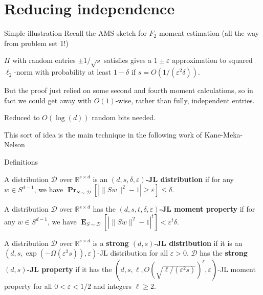 \documentclass[10pt]{beamer}
\newcommand{\R}{\mathbb{R}}
\renewcommand{\P}{\operatorname*{\mathbf{Pr}}}
\newcommand{\E}{\operatorname*{\mathbf{E}}}
\renewcommand{\l}{\left}
\renewcommand{\r}{\right}
\newcommand{\eps}{\varepsilon}
\begin{document}


\section{Reducing independence \cite{kane2011almost}}
\label{sec:}

\begin{frame}
  \sectionpage
\end{frame}

\begin{frame}{Simple illustration}
  Recall the AMS sketch for $F_2$ moment estimation (all the way from
  problem set 1!)

  \begin{theorem}
    $\Pi$ with random entries $\pm 1/\sqrt{s}$ satisfies gives a $1\pm
    \eps$ approximation to squared $\ell_2$-norm with probability at
    least $1 - \delta$ if $s = O(1/(\eps^2 \delta))$.
  \end{theorem}

  \pause\bigskip\bigskip
  But the proof just relied on some second and fourth moment
  calculations, so in fact we could get away with $O(1)$-wise, rather
  than fully, independent entries.

  \bigskip
  Reduced to $O(\log(d))$ random bits needed.

  \pause\bigskip\bigskip
  This sort of idea is the main technique in the following work of
  Kane-Meka-Nelson \cite{kane2011almost}
\end{frame}

\begin{frame}{Definitions}

  \begin{definition}
    A distribution $\mathcal{D}$ over $\R^{s\times d}$ is an
    \textbf{$(d,s,\delta,\eps)$-JL distribution} if for any $w\in
    S^{d-1}$, we have
    $\P_{S\sim\mathcal{D}}\l[|\|Sw\|^2-1|\geq\eps\r]\leq\delta$.
  \end{definition}

  \pause\bigskip

  \begin{definition}
    A distribution $\mathcal{D}$ over $\R^{s\times d}$ has the
    \textbf{$(d,s,t,\delta,\eps)$-JL moment property} if for any $w\in
    S^{d-1}$, we have
    $\E_{S\sim\mathcal{D}}\l[|\|Sw\|^2-1|^t\r]<\eps^t\delta$.
  \end{definition}

  \pause\bigskip

  \begin{definition}
    A distribution $\mathcal{D}$ over $\R^{s\times d}$ is a \textbf{strong
      $(d,s)$-JL distribution} if it is an
    $(d,s,\exp(-\Omega(\eps^2s)),\eps)$-JL distribution for all
    $\eps>0$. $\mathcal{D}$ has the \textbf{strong $(d,s)$-JL property} if
    it has the $(d,s,\ell,O(\sqrt{\ell/(\eps^2s)})^\ell,\eps)$-JL
    moment property for all $0<\eps<1/2$ and integers $\ell\geq2$.
  \end{definition}

\end{frame}
\end{document}

